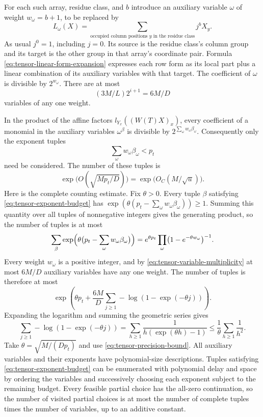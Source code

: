 For each such array, residue class, and $b$ introduce an auxiliary variable ${\omega}$
of weight $w_{\omega}=b+1$, to be replaced by
\[
 L_{\omega}(X)=\sum_{\text{occupied column positions }y\text{ in the residue class}}j^bX_y.
\]
As usual $j^0=1$, including $j=0$.
Its source is the residue class's column group and its target is the other
group in that array's coordinate pair.  Formula
\eqref{eq:tensor-linear-form-expansion} expresses each row form as its
local part plus a linear combination of its auxiliary variables with that target.
The coefficient of ${\omega}$ is divisible by $2^{w_{\omega}}$.
There are at most
\begin{equation}\label{eq:tensor-variable-multiplicity}
 (3M/L)2^{i+1}=6M/D
\end{equation}
variables of any one weight.

In the product of the affine factors
$l_{Y_x}((W(T)X)_x)$, every coefficient of a monomial in the auxiliary variables
${\omega}^\beta$ is divisible by $2^{\sum_{\omega}w_{\omega}\beta_{\omega}}$.
Consequently only the exponent tuples
\begin{equation}\label{eq:tensor-exponent-budget}
 \sum_{\omega}w_{\omega}\beta_{\omega}<p_t
\end{equation}
need be considered.  The number of these tuples is
\begin{equation}\label{eq:tensor-partition-count}
 \exp\bigl(O(\sqrt{Mp_t/D})\bigr)
       =\exp\bigl(O_C(M/\sqrt u)\bigr).
\end{equation}
Here is the complete counting estimate.  Fix $\theta>0$. Every tuple
$\beta$ satisfying \eqref{eq:tensor-exponent-budget} has
$\exp(\theta(p_t-\sum_{\omega}w_{\omega}\beta_{\omega}))\ge1$. Summing this quantity over
all tuples of nonnegative integers gives the generating product, so
the number of tuples is at most
\[
 \sum_{\beta}\exp\Bigl(\theta\bigl(p_t-\sum_{\omega}w_{\omega}\beta_{\omega}\bigr)\Bigr)
 =e^{\theta p_t}\prod_{\omega}\bigl(1-e^{-\theta w_{\omega}}\bigr)^{-1}.
\]
Every weight $w_{\omega}$ is a positive integer, and by
\eqref{eq:tensor-variable-multiplicity} at most $6M/D$ auxiliary variables have
any one weight. The number of tuples is therefore at most
\[
 \exp\left(\theta p_t+\frac{6M}{D}
                   \sum_{j\ge1}-\log(1-\exp(-\theta j))\right).
\]
Expanding the logarithm and summing the geometric series gives
\[
 \sum_{j\ge1}-\log(1-\exp(-\theta j))
  =\sum_{h\ge1}\frac1{h(\exp(\theta h)-1)}
  \le\frac1\theta\sum_{h\ge1}\frac1{h^2}.
\]
Take $\theta=\sqrt{M/(Dp_t)}$ and use
\eqref{eq:tensor-precision-bound}.  All auxiliary variables and their
exponents have polynomial-size descriptions.  Tuples satisfying
\eqref{eq:tensor-exponent-budget} can be enumerated with polynomial
delay and space by ordering the variables and successively choosing
each exponent subject to the remaining budget.  Every feasible partial
choice has the all-zero continuation, so the number of visited
partial choices is at most the number of complete tuples times
the number of variables, up to an additive constant.

